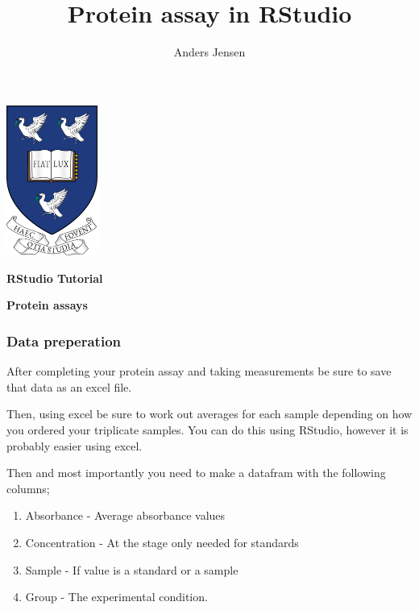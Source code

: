 \documentclass[
]{article}
\title{Protein assay in RStudio}
\author{Anders Jensen}
\date{}
\providecommand{\tightlist}{%
  \setlength{\itemsep}{0pt}\setlength{\parskip}{0pt}}
\begin{document}
\maketitle

\begin{center}
\includegraphics[width=3cm, height=4.935cm]{../Images/liverpool logo.png}
\end{center}

\vspace{1cm}

\begin{center}
\textbf{\LARGE RStudio Tutorial}
\end{center}

\vspace{1cm}

\begin{center}
\textbf{\LARGE Protein assays}
\end{center}

\pagebreak

\subsubsection{Data preperation}\label{data-preperation}

After completing your protein assay and taking measurements be sure to
save that data as an excel file.

Then, using excel be sure to work out averages for each sample depending
on how you ordered your triplicate samples. You can do this using
RStudio, however it is probably easier using excel.

Then and most importantly you need to make a datafram with the following
columns;

\begin{enumerate}
\def\labelenumi{\arabic{enumi})}
\tightlist
\item
  Absorbance - Average absorbance values
\item
  Concentration - At the stage only needed for standards
\item
  Sample - If value is a standard or a sample
\item
  Group - The experimental condition.
\end{enumerate}
\end{document}
